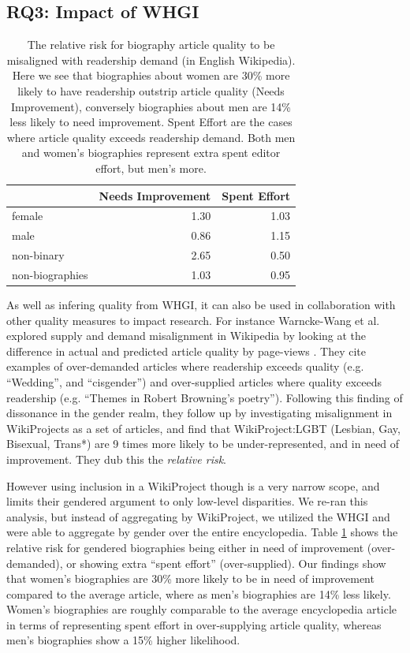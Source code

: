 \documentclass{sig-alternate-05-2015}
\begin{document}
\subsection{RQ3: Impact of WHGI}

\begin{table}
\caption{The relative risk for biography article quality to be misaligned with readership demand (in English Wikipedia). Here we see that biographies about women are 30\% more likely to have readership outstrip article quality (Needs Improvement), conversely biographies about men are 14\% less likely to need improvement. Spent Effort are the cases where article quality exceeds readership demand. Both men and women's biographies represent extra spent editor effort, but men's more.}
\begin{tabular}{lrr}
\toprule
{} &   Needs Improvement &   Spent Effort \\
\midrule
female & 1.30 & 1.03 \\
male   & 0.86 & 1.15 \\
non-binary & 2.65 & 0.50 \\
non-biographies & 1.03 & 0.95 \\
\bottomrule
\end{tabular}
\label{table:pah}
\end{table}

As well as infering quality from WHGI, it can also be used in collaboration with other quality measures to impact research. For instance Warncke-Wang et al. explored supply and demand misalignment in Wikipedia by looking at the difference in actual and predicted article quality by page-views \cite{warncke-wang_misalignment_2015}. They cite examples of over-demanded articles where readership exceeds quality (e.g. ``Wedding'', and ``cisgender'') and over-supplied articles where quality exceeds readership (e.g. ``Themes in Robert Browning's poetry''). Following this finding of dissonance in the gender realm, they follow up by investigating misalignment in WikiProjects as a set of articles, and find that WikiProject:LGBT (Lesbian, Gay, Bisexual, Trans*) are 9 times more likely to be under-represented, and in need of improvement. They dub this the \textit{relative risk}.

However using inclusion in a WikiProject though is a very narrow scope, and limits their gendered argument to only low-level disparities. We re-ran this analysis, but instead of aggregating by WikiProject, we utilized the WHGI and were able to aggregate by gender over the entire encyclopedia. Table \ref{table:pah} shows the relative risk for gendered biographies being either in need of improvement (over-demanded), or showing extra ``spent effort'' (over-supplied). Our findings show that women's biographies are 30\% more likely to be in need of improvement compared to the average article, where as men's biographies are 14\% less likely. Women's biographies are roughly comparable to the average encyclopedia article in terms of representing spent effort in over-supplying article quality, whereas men's biographies show a 15\% higher likelihood.
\end{document}
